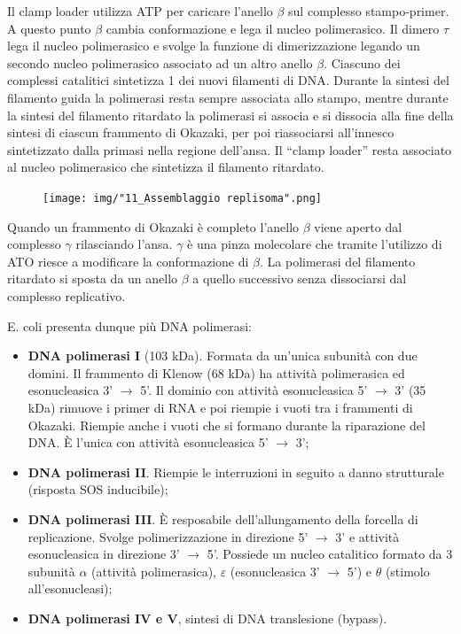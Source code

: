 \documentclass[11pt]{book}
\begin{document}
Il clamp loader utilizza ATP per caricare l'anello \(\beta\) sul
complesso stampo-primer. A questo punto \(\beta\) cambia conformazione e
lega il nucleo polimerasico. Il dimero \(\tau\) lega il nucleo
polimerasico e svolge la funzione di dimerizzazione legando un secondo
nucleo polimerasico associato ad un altro anello \(\beta\). Ciascuno dei
complessi catalitici sintetizza 1 dei nuovi filamenti di DNA. Durante la
sintesi del filamento guida la polimerasi resta sempre associata allo
stampo, mentre durante la sintesi del filamento ritardato la polimerasi
si associa e si dissocia alla fine della sintesi di ciascun frammento di
Okazaki, per poi riassociarsi all'innesco sintetizzato dalla primasi
nella regione dell'ansa. Il ``clamp loader'' resta associato al nucleo
polimerasico che sintetizza il filamento ritardato.

\begin{figure}[htp]
\centering
\texttt{[image: img/"11\_Assemblaggio replisoma".png]}
\caption{}
\label{assemblaggio-replisoma}
\end{figure}

\clearpage
Quando un frammento di Okazaki è completo l'anello \(\beta\) viene
aperto dal complesso \(\gamma\) rilasciando l'ansa. \(\gamma\) è una
pinza molecolare che tramite l'utilizzo di ATO riesce a modificare la
conformazione di \(\beta\). La polimerasi del filamento ritardato si
sposta da un anello \(\beta\) a quello successivo senza dissociarsi dal
complesso replicativo.

E. coli presenta dunque più DNA polimerasi:

\begin{itemize}
\itemsep1pt\parskip0pt
\item
  \textbf{DNA polimerasi I} (103 kDa). Formata da un'unica subunità con
  due domini. Il frammento di Klenow (68 kDa) ha attività polimerasica
  ed esonucleasica 3' \(\rightarrow\) 5'. Il dominio con attività
  esonucleasica 5' \(\rightarrow\) 3' (35 kDa) rimuove i primer di RNA e
  poi riempie i vuoti tra i frammenti di Okazaki. Riempie anche i vuoti
  che si formano durante la riparazione del DNA. È l'unica con attività
  esonucleasica 5' \(\rightarrow\) 3';
\item
  \textbf{DNA polimerasi II}. Riempie le interruzioni in seguito a danno
  strutturale (risposta SOS inducibile);
\item
  \textbf{DNA polimerasi III}. È resposabile dell'allungamento della
  forcella di replicazione. Svolge polimerizzazione in direzione 5'
  \(\rightarrow\) 3' e attività esonucleasica in direzione 3'
  \(\rightarrow\) 5'. Possiede un nucleo catalitico formato da 3
  subunità \(\alpha\) (attività polimerasica), \(\varepsilon\)
  (esonucleasica 3' \(\rightarrow\) 5') e \(\theta\) (stimolo
  all'esonucleasi);
\item
  \textbf{DNA polimerasi IV e V}, sintesi di DNA translesione (bypass).
\end{itemize}
\end{document}
